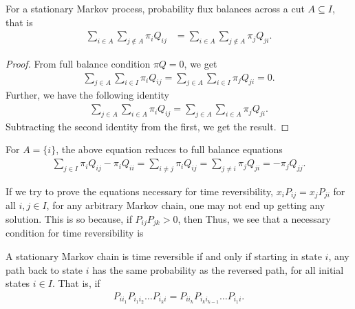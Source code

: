 \documentclass[a4paper,10pt,english]{article}
\begin{document}
\begin{lem} 
For a stationary Markov process, probability flux balances across a cut $A \subseteq I$, that is
\begin{align*}
\sum_{i \in A}\sum_{j \notin A} \pi_iQ_{ij} &= \sum_{i \in A}\sum_{j \notin A} \pi_jQ_{ji}.
\end{align*}
\end{lem}
\begin{proof} From full balance condition $\pi Q = 0$, we get
\begin{align*}
\sum_{j \in A}\sum_{i \in I}\pi_iQ_{ij} = \sum_{j \in A}\sum_{i \in I}\pi_j Q_{ji} = 0.
\end{align*}
Further, we have the following identity
\begin{align*}
\sum_{j \in A}\sum_{i \in A}\pi_iQ_{ij} = \sum_{j \in A}\sum_{i \in A}\pi_j Q_{ji}.
\end{align*}
Subtracting the second identity from the first, we get the result.
\end{proof}
\begin{cor} 
For $A= \{i\}$, the above equation reduces to full balance equations
\begin{align*}
\sum_{j \in I}\pi_i Q_{ij} - \pi_iQ_{ii} = \sum_{i \neq j}\pi_iQ_{ij} = \sum_{j \neq i}\pi_j Q_{ji} = -\pi_jQ_{jj}.
\end{align*}
\end{cor}

If we try to prove the equations necessary for time reversibility, $x_iP_{ij}=x_jP_{ji}$ for all $i,j \in I$, for any arbitrary Markov chain, one may not end up getting any solution. 
This is so because, if $P_{ij}P_{jk}>0$, then 
Thus, we see that a necessary condition for time reversibility is 
\begin{thm}
A stationary Markov chain is time reversible if and only if starting in state $i$, 
any path back to state $i$ has the same probability as the reversed path, for all initial states $i \in I$. 
That is, if
\begin{align*}
P_{i i_1}P_{i_1 i_2}\hdots P_{i_k i}=P_{ii_k}P_{i_k i_{k-1}} \hdots P_{i_1i}.
\end{align*} 
\end{thm}
\end{document}
